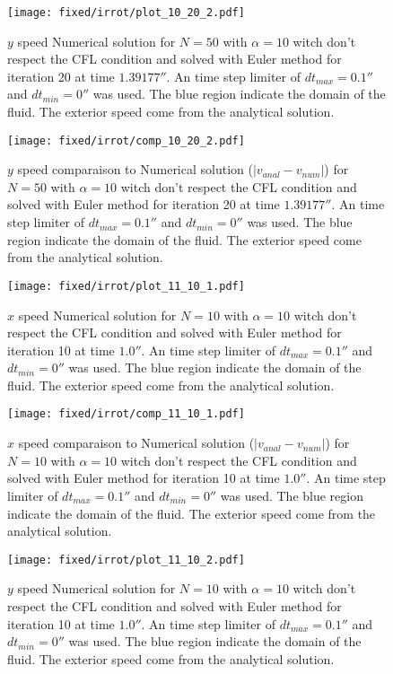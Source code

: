 \begin{figure}
\texttt{[image: fixed/irrot/plot\_10\_20\_2.pdf]}
\caption{$y$ speed Numerical solution for $N=50$ with $\alpha=10$ witch don't respect the CFL condition and solved with Euler method
for iteration 20 at time $\unit{1.39177}{\second}$.
An time step limiter of $dt_{max}=\unit{0.1}{\second}$ and $dt_{min}=\unit{0}{\second}$ was used.
The blue region indicate the domain of the fluid. The exterior speed come from the analytical solution.
\label{fix:plot_10_20_2}
}
\end{figure}

\begin{figure}
\texttt{[image: fixed/irrot/comp\_10\_20\_2.pdf]}
\caption{$y$ speed comparaison to Numerical solution ($|v_{anal}-v_{num}|$) for $N=50$ with $\alpha=10$ witch don't respect the CFL condition and solved with Euler method
for iteration 20 at time $\unit{1.39177}{\second}$.
An time step limiter of $dt_{max}=\unit{0.1}{\second}$ and $dt_{min}=\unit{0}{\second}$ was used.
The blue region indicate the domain of the fluid. The exterior speed come from the analytical solution.
\label{fix:comp_10_20_2}
}
\end{figure}

\begin{figure}
\texttt{[image: fixed/irrot/plot\_11\_10\_1.pdf]}
\caption{$x$ speed Numerical solution for $N=10$ with $\alpha=10$ witch don't respect the CFL condition and solved with Euler method
for iteration 10 at time $\unit{1.0}{\second}$.
An time step limiter of $dt_{max}=\unit{0.1}{\second}$ and $dt_{min}=\unit{0}{\second}$ was used.
The blue region indicate the domain of the fluid. The exterior speed come from the analytical solution.
\label{fix:plot_11_10_1}
}
\end{figure}

\begin{figure}
\texttt{[image: fixed/irrot/comp\_11\_10\_1.pdf]}
\caption{$x$ speed comparaison to Numerical solution ($|v_{anal}-v_{num}|$) for $N=10$ with $\alpha=10$ witch don't respect the CFL condition and solved with Euler method
for iteration 10 at time $\unit{1.0}{\second}$.
An time step limiter of $dt_{max}=\unit{0.1}{\second}$ and $dt_{min}=\unit{0}{\second}$ was used.
The blue region indicate the domain of the fluid. The exterior speed come from the analytical solution.
\label{fix:comp_11_10_1}
}
\end{figure}

\begin{figure}
\texttt{[image: fixed/irrot/plot\_11\_10\_2.pdf]}
\caption{$y$ speed Numerical solution for $N=10$ with $\alpha=10$ witch don't respect the CFL condition and solved with Euler method
for iteration 10 at time $\unit{1.0}{\second}$.
An time step limiter of $dt_{max}=\unit{0.1}{\second}$ and $dt_{min}=\unit{0}{\second}$ was used.
The blue region indicate the domain of the fluid. The exterior speed come from the analytical solution.
\label{fix:plot_11_10_2}
}
\end{figure}

